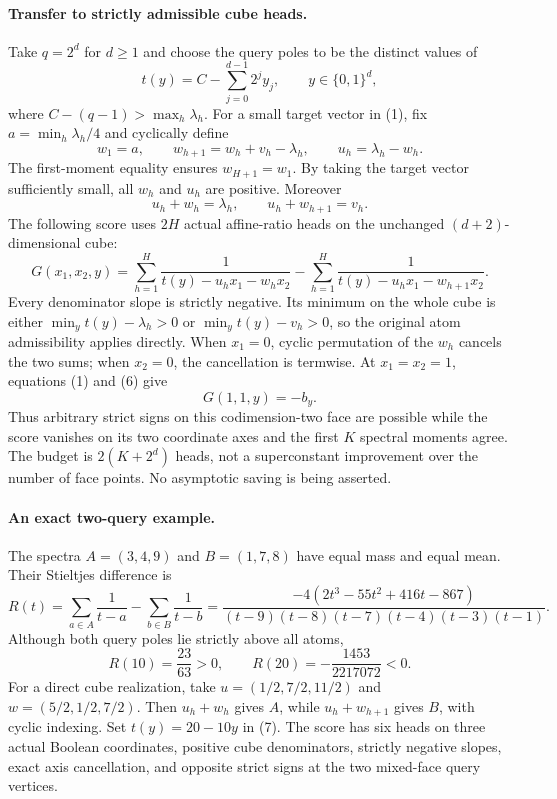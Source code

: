 \documentclass[11pt]{article}
\begin{document}
\paragraph{Transfer to strictly admissible cube heads.}
Take $q=2^d$ for $d\geq1$ and choose the query poles to be the
distinct values of
\[
       t(y)=C-\sum_{j=0}^{d-1}2^j y_j,
       \qquad y\in\{0,1\}^d,
 \tag{4}
\]
where $C-(q-1)>\max_h\lambda_h$.
For a small target vector in (1), fix
$a=\min_h\lambda_h/4$ and cyclically define
\[
 w_1=a,\qquad w_{h+1}=w_h+v_h-\lambda_h,
 \qquad u_h=\lambda_h-w_h.
 \tag{5}
\]
The first-moment equality ensures $w_{H+1}=w_1$. By taking the
target vector sufficiently small, all $w_h$ and $u_h$ are positive.
Moreover
\[
       u_h+w_h=\lambda_h,
       \qquad u_h+w_{h+1}=v_h.
 \tag{6}
\]
The following score uses $2H$ actual affine-ratio heads on the
unchanged $(d+2)$-dimensional cube:
\[
 G(x_1,x_2,y)=
 \sum_{h=1}^H\frac1{t(y)-u_hx_1-w_hx_2}
 -\sum_{h=1}^H\frac1{t(y)-u_hx_1-w_{h+1}x_2}.
 \tag{7}
\]
Every denominator slope is strictly negative. Its minimum on the
whole cube is either $\min_y t(y)-\lambda_h>0$ or
$\min_y t(y)-v_h>0$, so the original atom admissibility applies
directly. When $x_1=0$, cyclic permutation of the $w_h$ cancels the
two sums; when $x_2=0$, the cancellation is termwise. At
$x_1=x_2=1$, equations (1) and (6) give
\[
                 G(1,1,y)=-b_y.
 \tag{8}
\]
Thus arbitrary strict signs on this codimension-two face are
possible while the score vanishes on its two coordinate axes and
the first $K$ spectral moments agree. The budget is $2(K+2^d)$
heads, not a superconstant improvement over the number of face
points. No asymptotic saving is being asserted.

\paragraph{An exact two-query example.}
The spectra $A=(3,4,9)$ and $B=(1,7,8)$ have equal mass and equal
mean. Their Stieltjes difference is
\[
 R(t)=\sum_{a\in A}\frac1{t-a}-\sum_{b\in B}\frac1{t-b}
 =\frac{-4(2t^3-55t^2+416t-867)}
 {(t-9)(t-8)(t-7)(t-4)(t-3)(t-1)}.
 \tag{9}
\]
Although both query poles lie strictly above all atoms,
\[
                 R(10)=\frac{23}{63}>0,
 \qquad R(20)=-\frac{1453}{2217072}<0.
 \tag{10}
\]
For a direct cube realization, take
$u=(1/2,7/2,11/2)$ and $w=(5/2,1/2,7/2)$.
Then $u_h+w_h$ gives $A$, while $u_h+w_{h+1}$ gives $B$,
with cyclic indexing. Set $t(y)=20-10y$ in (7). The score has
six heads on three actual Boolean coordinates, positive cube
denominators, strictly negative slopes, exact axis cancellation,
and opposite strict signs at the two mixed-face query vertices.
\end{document}
